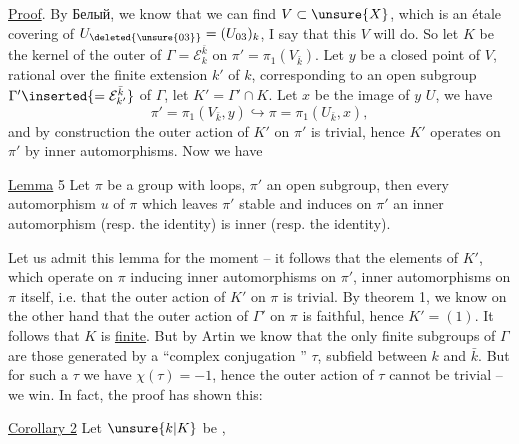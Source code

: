 

\uline{Proof}. By Белый, we know that we can find $V\subset\unsure{X}$, which is an étale covering of $U_{\deleted{\unsure{03}}}=(U_{03})_k$, I say that this $V$ will do. So let $K$ be the kernel of the outer  of $\Gamma=\mathcal E_k^{\bar k}$ on $\pi'=\pi_1(V_{\bar k})$. Let $y$ be a closed point of $V$, rational over the finite extension $k'$ of $k$, corresponding to an open subgroup $\Gamma'\inserted{=\mathcal E_{k'}^{\bar k}}$ of $\Gamma$, let $K'=\Gamma'\cap K$. Let $x$ be the image of $y$  $U$, we have
\[
\pi'=\pi_1(V_{\bar k},y)\hookrightarrow\pi=\pi_1(U_{\bar k},x),
\]
and by construction the outer action of $K'$ on $\pi'$ is trivial, hence $K'$ operates on $\pi'$ by inner automorphisms. Now we have

\uline{Lemma} 5 Let $\pi$ be a  group with loops, $\pi'$ an open subgroup, then every automorphism $u$ of $\pi$ which leaves $\pi'$ stable and induces on $\pi'$ an inner automorphism (resp. the identity) is inner (resp. the identity).



Let us admit this lemma for the moment -- it follows that the elements of $K'$, which operate on $\pi$ inducing inner automorphisms on $\pi'$,  inner automorphisms on $\pi$ itself, i.e. that the outer action of $K'$ on $\pi$ is trivial. By theorem 1, we know on the other hand that the outer action of $\Gamma'$ on $\pi$ is faithful, hence $K'=(1)$. It follows that $K$ is \uline{finite}. But by Artin we know that the only finite subgroups  of $\Gamma$ are those generated by a ``complex conjugation '' $\tau$,     subfield between $k$ and $\bar k$. But for such a $\tau$ we have $\chi(\tau)=-1$, hence the outer action of $\tau$ cannot be trivial -- we win. In fact, the proof has shown this:

\uline{Corollary 2} Let $\unsure{k|K}$ be  ,


